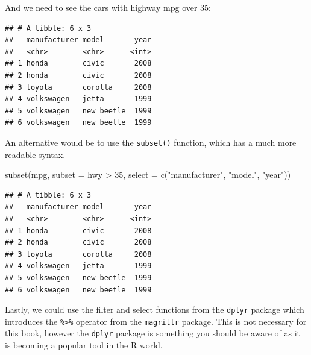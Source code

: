 \documentclass[
]{book}
\newenvironment{Shaded}{\begin{snugshade}}{\end{snugshade}}
\newcommand{\AttributeTok}[1]{\textcolor[rgb]{0.77,0.63,0.00}{#1}}
\newcommand{\DecValTok}[1]{\textcolor[rgb]{0.00,0.00,0.81}{#1}}
\newcommand{\FunctionTok}[1]{\textcolor[rgb]{0.00,0.00,0.00}{#1}}
\newcommand{\NormalTok}[1]{#1}
\newcommand{\SpecialCharTok}[1]{\textcolor[rgb]{0.00,0.00,0.00}{#1}}
\newcommand{\StringTok}[1]{\textcolor[rgb]{0.31,0.60,0.02}{#1}}
\begin{document}
And we need to see the cars with highway mpg over 35:

\begin{Shaded}
\end{Shaded}

\begin{verbatim}
## # A tibble: 6 x 3
##   manufacturer model       year
##   <chr>        <chr>      <int>
## 1 honda        civic       2008
## 2 honda        civic       2008
## 3 toyota       corolla     2008
## 4 volkswagen   jetta       1999
## 5 volkswagen   new beetle  1999
## 6 volkswagen   new beetle  1999
\end{verbatim}

An alternative would be to use the \texttt{subset()} function, which has a much more readable syntax.

\begin{Shaded}
\begin{Highlighting}[]
\FunctionTok{subset}\NormalTok{(mpg, }\AttributeTok{subset =}\NormalTok{ hwy }\SpecialCharTok{\textgreater{}} \DecValTok{35}\NormalTok{, }\AttributeTok{select =} \FunctionTok{c}\NormalTok{(}\StringTok{"manufacturer"}\NormalTok{, }\StringTok{"model"}\NormalTok{, }\StringTok{"year"}\NormalTok{))}
\end{Highlighting}
\end{Shaded}

\begin{verbatim}
## # A tibble: 6 x 3
##   manufacturer model       year
##   <chr>        <chr>      <int>
## 1 honda        civic       2008
## 2 honda        civic       2008
## 3 toyota       corolla     2008
## 4 volkswagen   jetta       1999
## 5 volkswagen   new beetle  1999
## 6 volkswagen   new beetle  1999
\end{verbatim}

Lastly, we could use the filter and select functions from the \texttt{dplyr} package which introduces the \texttt{\%\textgreater{}\%} operator from the \texttt{magrittr} package. This is not necessary for this book, however the \texttt{dplyr} package is something you should be aware of as it is becoming a popular tool in the R world.
\end{document}
